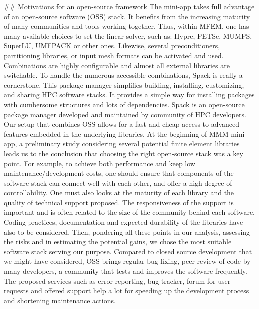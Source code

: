 ## Motivations for an open-source framework
The mini-app takes full advantage of an open-source software (OSS) stack. It benefits from the increasing maturity of many communities and tools working together. Thus, within MFEM, one has many available choices to set the linear solver, such as: Hypre, PETSc, MUMPS, SuperLU, UMFPACK or other ones. Likewise, several preconditioners, partitioning libraries, or input mesh formats can be activated and used. Combinations are highly configurable and almost all external libraries are switchable. To handle the numerous accessible combinations, Spack is really a cornerstone. This package manager simplifies building, installing, customizing, and sharing HPC software stacks. It provides a simple way for installing packages with cumbersome structures and lots of dependencies. Spack is an open-source package manager developed and maintained by community of HPC developers. Our setup that combines OSS allows for a fast and cheap access to advanced features embedded in the underlying libraries. At the beginning of MMM mini-app, a preliminary study considering several potential finite element libraries leads us to the conclusion that choosing the right open-source stack was a key point. For example, to achieve both performance and keep low maintenance/development costs, one should ensure that components of the software stack can connect well with each other, and offer a high degree of controllability. One must also looks at the maturity of each library and the quality of technical support proposed. The responsiveness of the support is important and is often related to the size of the community behind each software. Coding practices, documentation and expected durability of the libraries have also to be considered. Then, pondering all these points in our analysis, assessing the risks and in estimating the potential gains, we chose the most suitable software stack serving our purpose. 
Compared to closed source development that we might have considered, OSS brings regular bug fixing, peer review of code by many developers, a community that tests and improves the software frequently. The proposed services such as error reporting, bug tracker, forum for user requests and offered support help a lot for speeding up the development process and shortening maintenance actions. 
